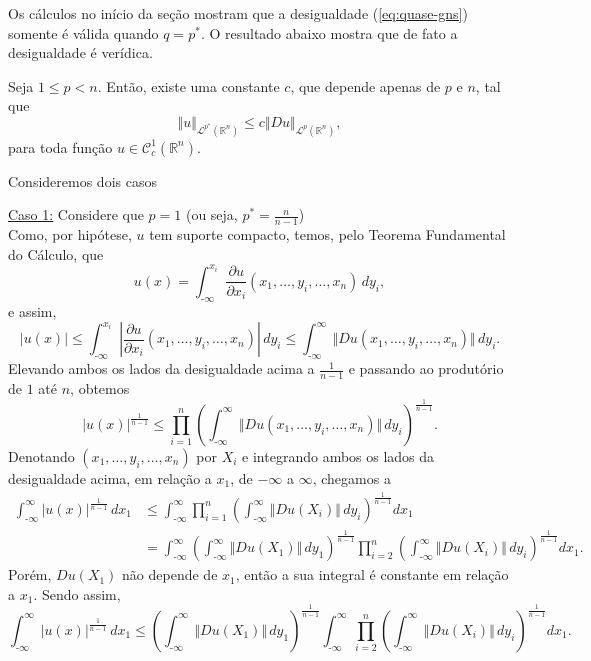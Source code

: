 \documentclass[a4paper, 11pt]{book}
\theoremstyle{definition}
\newcommand{\m}{\text{-}}
\newcommand{\bR}{\mathbb{R}}
\newcommand{\cC}{\mathcal{C}}
\newcommand{\cL}{\mathcal{L}}
\begin{document}
Os cálculos no início da seção mostram que a desigualdade (\ref{eq:quase-gns}) somente é válida quando $q = p^*$. O resultado abaixo mostra que de fato a desigualdade é verídica.

\begin{tbox} Seja $1 \leqslant p < n$. Então, existe uma constante $c$, que depende apenas de $p$ e $n$, tal que
\begin{equation} \label{eq:gns}
    \Vert u \Vert_{\cL^{p^*}(\bR^n)} \leqslant c \Vert Du \Vert_{\cL^p(\bR^n)},
\end{equation}
para toda função $u \in \cC^1_c(\bR^n)$.
\end{tbox}
\begin{prf}
    Consideremos dois casos

    \underline{Caso 1:} Considere que $p = 1$ (ou seja, $p^* = \frac{n}{n-1}$)\\
    Como, por hipótese, $u$ tem suporte compacto, temos, pelo Teorema Fundamental do Cálculo, que
    \[
        u(x) = \int_{\m\infty}^{x_i} \dfrac{\partial u}{\partial x_i}(x_1,\dots,y_i,\dots,x_n) \, dy_i,
    \]
    e assim,
    \[
        |u(x)| \leqslant \int_{\m\infty}^{x_i} \left|\dfrac{\partial u}{\partial x_i}(x_1,\dots,y_i,\dots,x_n)\right| \, dy_i  \leqslant \int_{\m\infty}^{\infty} \Vert Du(x_1,\dots,y_i,\dots,x_n) \Vert \,dy_i.
    \]
    Elevando ambos os lados da desigualdade acima a $\frac{1}{n-1}$ e passando ao produtório de $1$ até $n$, obtemos
    \[
        |u(x)|^{\frac{1}{n-1}} \leqslant \prod_{i=1}^n \left( \int_{\m\infty}^{\infty} \Vert Du(x_1,\dots,y_i,\dots,x_n) \Vert \,dy_i \right)^{\frac{1}{n-1}}.
    \]
    Denotando $(x_1,\dots,y_i,\dots,x_n)$ por $X_i$ e integrando ambos os lados da desigualdade acima, em relação a $x_1$, de $-\infty$ a $\infty$, chegamos a
    \[
        \begin{aligned}
            \int_{\m\infty}^{\infty} |u(x)|^{\frac{1}{n-1}} \,dx_1 &\leqslant \int_{\m\infty}^{\infty} \prod_{i=1}^n \left( \int_{\m\infty}^{\infty} \Vert Du(X_i) \Vert \,dy_i \right)^{\frac{1}{n-1}}  dx_1\\ 
            &= \int_{\m\infty}^{\infty} \left( \int_{\m\infty}^{\infty} \Vert Du(X_1    ) \Vert \,dy_1 \right)^{\frac{1}{n-1}}  \prod_{i=2}^n \left(\int_{\m\infty}^{\infty} \Vert Du(X_i) \Vert \, dy_i\right)^{\frac{1}{n-1}} dx_1.
        \end{aligned}
    \]
    Porém, $Du(X_1)$ não depende de $x_1$, então a sua integral é constante em relação a $x_1$. Sendo assim,
    \[
        \int_{\m\infty}^{\infty} |u(x)|^{\frac{1}{n-1}} \,dx_1 \leqslant \left( \int_{\m\infty}^{\infty} \Vert Du(X_1)\Vert \,dy_1 \right)^{\frac{1}{n-1}}\int_{\m\infty}^{\infty}   \prod_{i=2}^n \left(\int_{\m\infty}^{\infty} \Vert Du(X_i) \Vert \, dy_i\right)^{\frac{1}{n-1}} dx_1.
\]
\end{prf}
\end{document}
